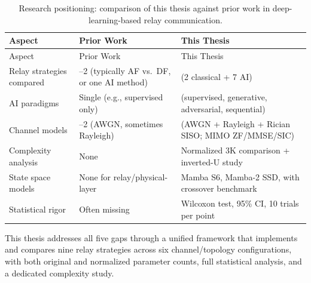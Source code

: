 \documentclass[
  english,
  12pt,
  12pt,
  a4paper,
  oneside]{report}
\begin{document}
\begin{longtable}[]{@{}
  >{\raggedright\arraybackslash}p{}
  >{\raggedright\arraybackslash}p{}
  >{\raggedright\arraybackslash}p{}@{}}
\caption{Research positioning: comparison of this thesis against prior work in deep-learning-based relay communication.}\label{tbl:table17}\tabularnewline
\toprule\noalign{}
\begin{minipage}[b]{\linewidth}\raggedright
Aspect
\end{minipage} & \begin{minipage}[b]{\linewidth}\raggedright
Prior Work
\end{minipage} & \begin{minipage}[b]{\linewidth}\raggedright
This Thesis
\end{minipage} \\
\midrule\noalign{}
\endfirsthead
\toprule\noalign{}
\begin{minipage}[b]{\linewidth}\raggedright
Aspect
\end{minipage} & \begin{minipage}[b]{\linewidth}\raggedright
Prior Work
\end{minipage} & \begin{minipage}[b]{\linewidth}\raggedright
This Thesis
\end{minipage} \\
\midrule\noalign{}
\endhead
\bottomrule\noalign{}
\endlastfoot
Relay strategies compared & 1--2 (typically AF vs.~DF, or one AI method) & 9 (2 classical + 7 AI) \\
AI paradigms & Single (e.g., supervised only) & 4 (supervised, generative, adversarial, sequential) \\
Channel models & 1--2 (AWGN, sometimes Rayleigh) & 6 (AWGN + Rayleigh + Rician SISO; MIMO ZF/MMSE/SIC) \\
Complexity analysis & None & Normalized 3K comparison + inverted-U study \\
State space models & None for relay/physical-layer & Mamba S6, Mamba-2 SSD, with crossover benchmark \\
Statistical rigor & Often missing & Wilcoxon test, 95\% CI, 10 trials per point \\
\end{longtable}

This thesis addresses all five gaps through a unified framework that implements and compares nine relay strategies across six channel/topology configurations, with both original and normalized parameter counts, full statistical analysis, and a dedicated complexity study.
\end{document}
